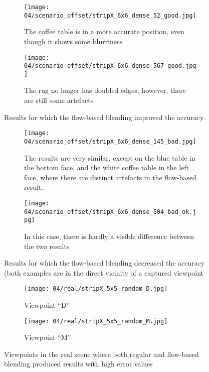 \begin{figure}
\centering
    \hfill
    \begin{subfigure}[b]{\textwidth}
            \centering
            \texttt{[image: 04/scenario\_offset/stripX\_6x6\_dense\_52\_good.jpg]}
            \caption{The coffee table is in a more accurate position, even though it shows some blurriness}
    \end{subfigure}
    \hfill

    \hfill
    \begin{subfigure}[b]{\textwidth}
            \centering
            \texttt{[image: 04/scenario\_offset/stripX\_6x6\_dense\_567\_good.jpg]}
            \caption{The rug no longer has doubled edges, however, there are still some artefacts}
    \end{subfigure}
    \hfill
  \caption{Results for which the flow-based blending improved the accuracy} \label{fig:offset_good}
\end{figure}

\begin{figure}
\centering
    \hfill
    \begin{subfigure}[b]{\textwidth}
            \centering
            \texttt{[image: 04/scenario\_offset/stripX\_6x6\_dense\_145\_bad.jpg]}
            \caption{The results are very similar, except on the blue table in the bottom face, and the white coffee table in the left face, where there are distinct artefacts in the flow-based result.}
    \end{subfigure}
    \hfill

    \hfill
    \begin{subfigure}[b]{\textwidth}
            \centering
            \texttt{[image: 04/scenario\_offset/stripX\_6x6\_dense\_504\_bad\_ok.jpg]}
            \caption{In this case, there is hardly a visible difference between the two results}
    \end{subfigure}
    \hfill
  \caption{Results for which the flow-based blending decreased the accuracy (both examples are in the direct vicinity of a captured viewpoint} \label{fig:offset_bad}
\end{figure}

\begin{figure}
\centering
    \hfill
    \begin{subfigure}[b]{\textwidth}
            \centering
            \texttt{[image: 04/real/stripX\_5x5\_random\_D.jpg]}
            \caption{Viewpoint ``D''}
    \end{subfigure}
    \hfill

    \hfill
    \begin{subfigure}[b]{\textwidth}
            \centering
            \texttt{[image: 04/real/stripX\_5x5\_random\_M.jpg]}
            \caption{Viewpoint ``M''}
    \end{subfigure}
    \hfill
  \caption{Viewpoints in the real scene where both regular and flow-based blending produced results with high error values} \label{fig:real_bad}
\end{figure}

